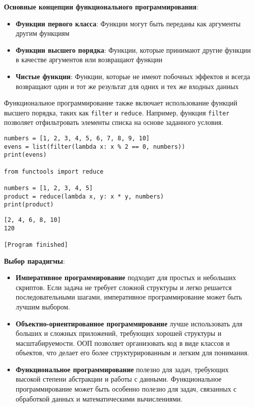 \textbf{Основные концепции функционального программирования}:
\begin{itemize}
    \item \textbf{Функции первого класса}: Функции могут быть переданы как аргументы другим функциям
    \item \textbf{Функции высшего порядка}: Функции, которые принимают другие функции в качестве аргументов или возвращают функции
    \item \textbf{Чистые функции}: Функции, которые не имеют побочных эффектов и всегда возвращают один и тот же результат для одних и тех же входных данных
\end{itemize}

Функциональное программирование также включает использование функций высшего порядка, таких как \verb!filter! и \verb!reduce!. Например, функция \verb!filter! позволяет отфильтровать элементы списка на основе заданного условия.

\begin{verbatim}
numbers = [1, 2, 3, 4, 5, 6, 7, 8, 9, 10]
evens = list(filter(lambda x: x % 2 == 0, numbers))
print(evens)

from functools import reduce

numbers = [1, 2, 3, 4, 5]
product = reduce(lambda x, y: x * y, numbers)
print(product)
\end{verbatim}

\begin{verbatim}
[2, 4, 6, 8, 10]
120

[Program finished]
\end{verbatim}

\textbf{Выбор парадигмы}:
\begin{itemize}
    \item \textbf{Императивное программирование} подходит для простых и небольших скриптов. Если задача не требует сложной структуры и легко решается последовательными шагами, императивное программирование может быть лучшим выбором.
    \item \textbf{Объектно-ориентированное программирование} лучше использовать для больших и сложных приложений, требующих хорошей структуры и масштабируемости. ООП позволяет организовать код в виде классов и объектов, что делает его более структурированным и легким для понимания.
    \item \textbf{Функциональное программирование} полезно для задач, требующих высокой степени абстракции и работы с данными. Функциональное программирование может быть особенно полезно для задач, связанных с обработкой данных и математическими вычислениями.
\end{itemize}


